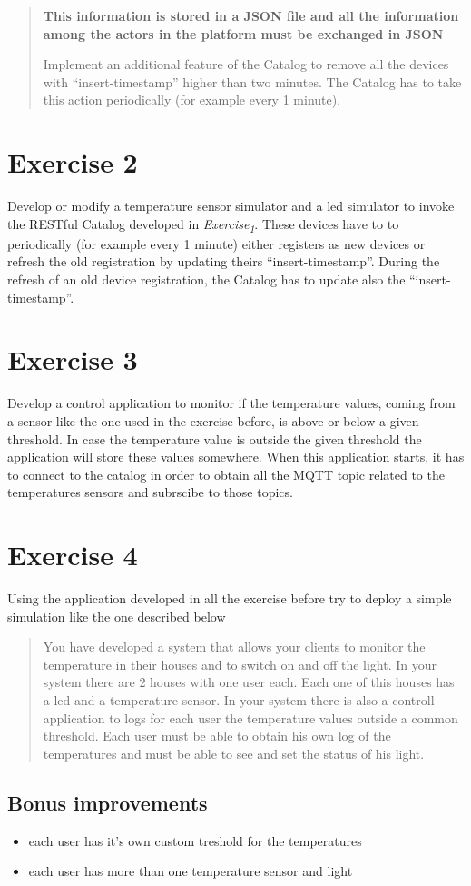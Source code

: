 \documentclass{article}
\begin{document}
\begin{quote}
\textbf{This information is stored in a JSON file and all the information
among the actors in the platform must be exchanged in JSON}

Implement an additional feature of the Catalog to remove all the
devices with “insert-timestamp” higher than two minutes. The Catalog
has to take this action periodically (for example every 1 minute).
\end{quote}

\section{Exercise 2}
\label{sec:orge3d413d}
Develop or modify a temperature sensor simulator and a led simulator to invoke the RESTful Catalog developed in \emph{Exercise\textsubscript{1}}. These devices have to  to periodically (for example every 1 minute) either registers as new devices or refresh the old registration by updating theirs “insert-timestamp”. During the refresh of an old device registration, the Catalog has to update also the “insert-timestamp”.

\section{Exercise 3}
\label{sec:org60240aa}
Develop a control application to monitor if the temperature values, coming from a sensor like the one used in the exercise before, is above or below a given threshold. In case the temperature value is outside the given threshold the application will store these values somewhere. When this application starts, it has to connect to the catalog in order to obtain all the MQTT topic related to the temperatures sensors and subrscibe to those topics.

\section{Exercise 4}
\label{sec:orgd170162}

Using the application developed in all the exercise before try to deploy a simple simulation like the one described below

\begin{quote}
You have developed a system that allows your clients to monitor the temperature in their houses and to switch on and off the light. In your system there are 2 houses with one user each. Each one of this houses has a led and a temperature sensor. In your system there is also a controll application to logs for each user the temperature values outside a common threshold. Each user must be able to obtain his own log of the temperatures and must be able to see and set the status of his light.
\end{quote}

\subsection{Bonus improvements}
\label{sec:orgd3017bd}
\begin{itemize}
\item each user has it's own custom treshold for the temperatures
\item each user has more than one temperature sensor and light
\end{itemize}
\end{document}
